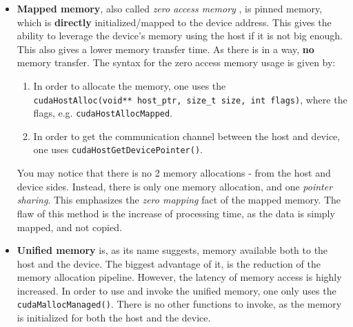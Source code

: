 \begin{itemize}
   \item \textbf{Mapped memory}, also called \textit{zero access memory}
     \cite{memory_model}, is pinned memory, which is \textbf{directly} initialized/mapped to the device address. 
    This gives the ability to leverage the device's memory using the host if it is not big enough.
    This also gives a lower memory transfer time. As there is in a way, \textbf{no} memory transfer.
    The syntax for the zero access memory usage is given by:
      \begin{enumerate}
        \item In order to allocate the memory, one uses the \\
          \verb|cudaHostAlloc(void** host_ptr, size_t size, int flags)|, where the flags, e.g. \verb|cudaHostAllocMapped|.
        \item In order to get the communication channel between the host and device, one uses 
          \verb|cudaHostGetDevicePointer()|.
      \end{enumerate}
    You may notice that there is no 2 memory allocations - from the host and device sides. Instead, 
    there is only one memory allocation, and one \textit{pointer sharing}. This emphasizes the \textit{zero mapping}
    fact of the mapped memory.
The flaw of this method is the increase of processing time, as the data is simply mapped, and not copied.

   \item \textbf{Unified memory} is, as its name suggests, memory available both to the host and the device. 
     The biggest advantage of it, is the reduction of the memory allocation pipeline. 
     However, the latency of memory access is highly increased. 
     In order to use and invoke the unified memory, one only uses the \verb|cudaMallocManaged()|. 
     There is no other functions to invoke, as the memory is initialized for both the host and the device.

   \label{mem_alloc}
  

\end{itemize}
